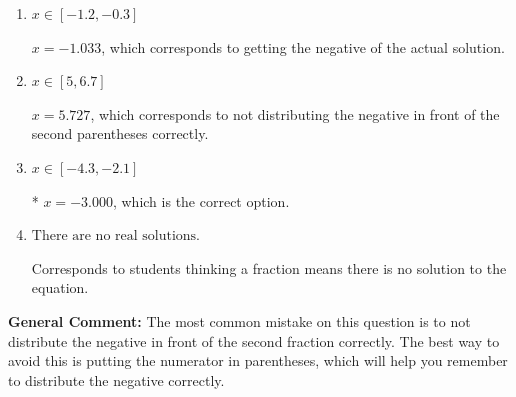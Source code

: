 \documentclass{extbook}[14pt]
\begin{document}
\begin{enumerate}
{\begin{enumerate}[label=\Alph*.]
$x = -5.727$, which corresponds to not distributing the negative in front of the first parentheses correctly.
\item \( x \in [-1.2, -0.3] \)

$x = -1.033$, which corresponds to getting the negative of the actual solution.
\item \( x \in [5, 6.7] \)

$x = 5.727$, which corresponds to not distributing the negative in front of the second parentheses correctly.
\item \( x \in [-4.3, -2.1] \)

* $x = -3.000$, which is the correct option.
\item \( \text{There are no real solutions.} \)

Corresponds to students thinking a fraction means there is no solution to the equation.
\end{enumerate}

\textbf{General Comment:} The most common mistake on this question is to not distribute the negative in front of the second fraction correctly. The best way to avoid this is putting the numerator in parentheses, which will help you remember to distribute the negative correctly.
}
\end{enumerate}
\end{document}
